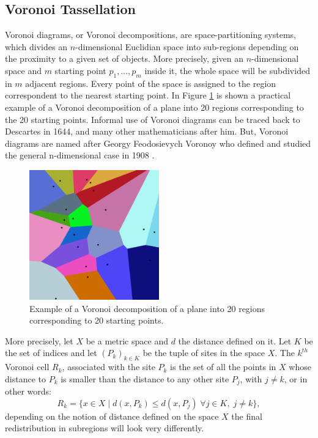 \subsection{Voronoi Tassellation} \label{ssec:vor_tass}
Voronoi diagrams, or Voronoi decompositions, are space-partitioning systems, which divides an $n$-dimensional Euclidian space into sub-regions depending on the proximity to a given set of objects. More precisely, given an $n$-dimensional space and $m$ starting point $p_1,\dots, p_m$ inside it, the whole space will be subdivided in $m$ adjacent regions. Every point of the space is assigned to the region correspondent to the nearest starting point. In Figure \ref{fig:vor_20} is shown a practical example of a Voronoi decomposition of a plane into 20 regions corresponding to the 20 starting points. Informal use of Voronoi diagrams can be traced back to Descartes in 1644, and many other mathematicians after him. But, Voronoi diagrams are named after Georgy Feodosievych Voronoy who defined and studied the general n-dimensional case in 1908 \cite{VoronoiNouvellesAD}.

\begin{figure}[b!]
    \centering
    \includegraphics[width = 0.5\textwidth]{images/vor_20}
    \caption{Example of a Voronoi decomposition of a plane into 20 regions corresponding to 20 starting points.}
    \label{fig:vor_20}
\end{figure}

More precisely, let $X$ be a metric space and $d$ the distance defined on it. Let $K$ be the set of indices and let $(P_k)_{k\in K}$ be the tuple of sites in the space $X$. The $k^{th}$ Voronoi cell $R_k$, associated with the site $P_k$ is the set of all the points in $X$ whose distance to $P_k$ is smaller than the distance to any other site $P_j$, with $j\neq k$, or in other words:
\begin{equation}
    R_k = \{x \in X\;|\;d(x,P_k) \le d(x,P_j)\; \forall j \in K, \;j\neq k \}, \label{eq:formal_Vor_def}
\end{equation}
depending on the notion of distance defined on the space $X$ the final redistribution in subregions will look very differently.

